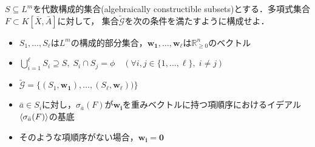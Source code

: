 \begin{problem}
	$S \subseteq L^m$を代数構成的集合(algebraically constructible subsets)とする．多項式集合$F \subset K[\bar{X}, \bar{A}]$に対して，
	集合$\tilde{\mathcal{G}}$を次の条件を満たすように構成せよ．
	\begin{itemize}
		\item $S_1, \dots, S_\ell$は$L^m$の構成的部分集合，$\bm{w_1}, \dots, \bm{w_\ell}$は$\mathbb{R}_{\ge 0}^{n}$のベクトル
		\item $\displaystyle \bigcup_{i=1}^\ell S_i \supseteq S, \; S_i \cap S_j = \phi \quad (\forall i, j \in \{1, \dots, \ell\}, \; i \ne j)$
		\item $\tilde{\mathcal{G}} = \{(S_1, \bm{w_1}), \dots, (S_\ell, \bm{w_\ell}))\}$
		\item $\bar{a} \in S_i$に対し，$\sigma_{\bar{a}}(F)$が$\bm{w_i}$を重みベクトルに持つ項順序におけるイデアル$\langle \sigma_{\bar{a}}(F) \rangle$の\groebner{}基底
		\item そのような項順序がない場合，$\bm{w_i} = \bm{0}$
	\end{itemize}
\end{problem}











